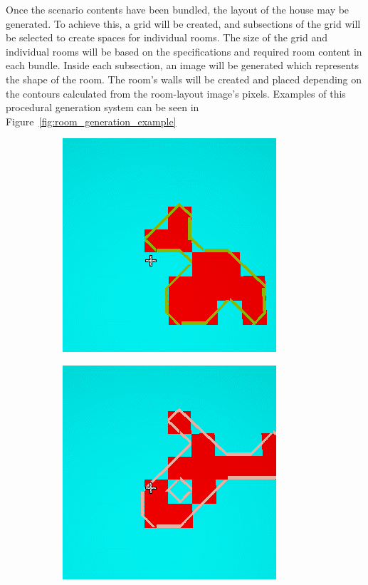 Once the scenario contents have been bundled, the layout of the house may be generated. To achieve this, a grid will be created, and subsections of the grid will be selected to create spaces for individual rooms. The size of the grid and individual rooms will be based on the specifications and required room content in each bundle. Inside each subsection, an image will be generated which represents the shape of the room. The room's walls will be created and placed depending on the contours calculated from the room-layout image's pixels. Examples of this procedural generation system can be seen in Figure~\ref{fig:room_generation_example}

\begin{figure}[htb]
 \centering
  \begin{subfigure}{.24\textwidth}
    \centering
    \includegraphics[width=.9\linewidth]{images/maps1}
  \end{subfigure}%
  \begin{subfigure}{.24\textwidth}
    \centering
    \includegraphics[width=.9\linewidth]{images/maps2}

\end{subfigure}
\end{figure}

